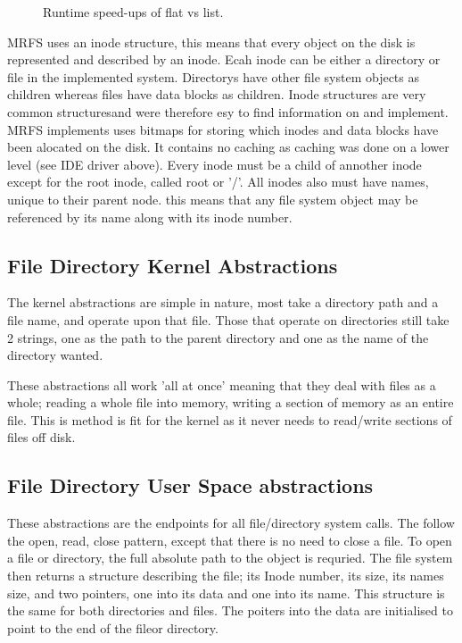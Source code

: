 \documentclass[a4paper]{report}
\begin{document}
\begin{figure}[ht]
  \centering

  \def\svgwidth{\columnwidth}
  \caption{Runtime speed-ups of flat vs list.}
  \label{fig:schedulerscreen}
\end{figure}

MRFS uses an inode structure, this means that every object on the disk is represented and described by an inode. Ecah inode can be either a directory or file in the implemented system. Directorys have other file system objects as children whereas files have data blocks as children. Inode structures are very common structuresand were therefore esy to find information on and implement. MRFS implements  uses bitmaps for storing which inodes and data blocks have been alocated on the disk. It contains no caching as caching was done on a lower level (see IDE driver above). Every inode must be a child of annother inode except for the root inode, called root or '/'. All inodes also must have names, unique to their parent node. this means that any file system object may be referenced by its name along with its inode number.

\subsection{File Directory Kernel Abstractions}

The kernel abstractions are simple in nature, most take a directory path and a file name, and operate upon that file. Those that operate on directories still take 2 strings, one as the path to the parent directory and one as the name of the directory wanted.

These abstractions all work 'all at once' meaning that they deal with files as a whole; reading a whole file into memory, writing a section of memory as an entire file. This is method is fit for the kernel as it never needs to read/write sections of files off disk.

\subsection{File Directory User Space abstractions}

These abstractions are the endpoints for all file/directory system calls. The follow the open, read, close pattern, except that there is no need to close a file. To open a file or directory, the full absolute path to the object is requried. The file system then returns a structure describing the file; its Inode number, its size, its names size, and two pointers, one into its data and one into its name. This structure is the same for both directories and files. The poiters into the data are initialised to point to the end of the fileor directory.
\end{document}
